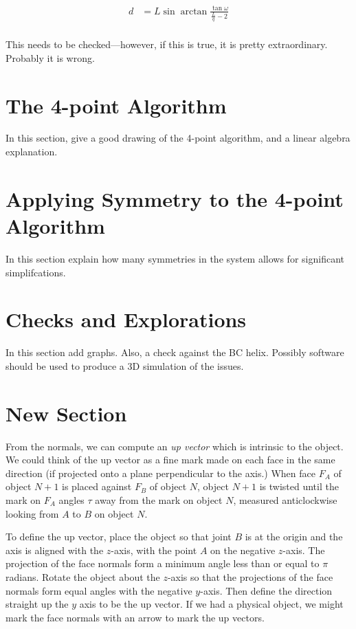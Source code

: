 \documentclass[11pt]{article}
\begin{document}
\begin{align}
  d  &= L \sin{\arctan{\frac{ \tan{\omega}}{\frac{L}{q} - 2}}} \\  
\end{align}

This needs to be checked---however, if this is true, it is pretty
extraordinary. Probably it is wrong.

\section{The 4-point Algorithm}

In this section, give a good drawing of the 4-point algorithm,
and a linear algebra explanation.

\section{Applying Symmetry to the 4-point Algorithm}

In this section explain how many symmetries in the system
allows for significant simplifcations.

\section{Checks and Explorations}

In this section add graphs. Also, a check against the BC helix.
Possibly software should be used to produce a 3D simulation
of the issues.

\section{New Section}

From the normals, we can compute an {\em up vector} which is intrinsic to the object.
We could think of the up vector as a fine mark made on each face in the same direction
(if projected onto a plane perpendicular to the axis.) When face $F_A$ of object $N+1$
is placed against $F_B$ of object $N$, object $N+1$ is twisted until the mark on $F_A$ angles
$\tau$ away from the mark on object $N$, measured anticlockwise looking from $A$ to $B$ on
object $N$.

To define the up vector, place the object so that joint $B$ is at the origin and the
axis is aligned with the $z$-axis, with the point $A$ on the negative $z$-axis.
The projection of the face normals form a minimum angle less than or equal to $\pi$
radians. Rotate the object about the $z$-axis so that the projections of the face normals
form equal angles with the negative $y$-axis. Then define the direction straight up
the $y$ axis to be the up vector. If we had a physical object, we might mark the face
normals with an arrow to mark the up vectors.
\end{document}
